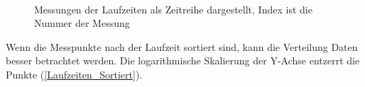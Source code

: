 \documentclass[
	12pt,
	a4paper,
	BCOR10mm,
	DIV14,
	listof=totoc,
	bibliography=totoc,
	headsepline
]{scrreprt}
\begin{document}
\begin{figure}
	\hfill
	\\
	\hfill
	\caption{Messungen der Laufzeiten als Zeitreihe dargestellt, Index ist die Nummer der Messung}
	\label{Laufzeiten_Zeitreihe}
\end{figure} 

Wenn die Messpunkte nach der Laufzeit sortiert sind, kann die Verteilung Daten besser betrachtet werden. Die logarithmische Skalierung der Y-Achse entzerrt die Punkte (\ref{Laufzeiten_Sortiert}).
\end{document}
